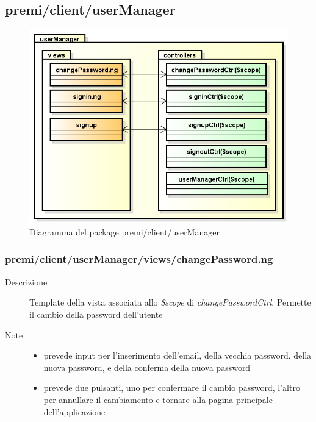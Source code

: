 \clearpage
\subsection{premi/client/userManager}
\begin{figure}[h]
\begin{center}
\includegraphics[scale=0.50]{img/diapkg/userManager.png}
\caption{Diagramma del package premi/client/userManager}
\end{center}
\end{figure}



\subsubsection{premi/client/userManager/views/changePassword.ng}

\begin{description}
\item[Descrizione] \hfill
	Template della vista associata allo \textit{\$scope} di \textit{changePasswordCtrl}. Permette il cambio della password dell'utente
\item[Note] \hfill
	\begin{itemize}
			\item prevede input per l'inserimento dell'email, della vecchia password, della nuova password, e della conferma della nuova password
			\item prevede due pulsanti, uno per confermare il cambio password, l'altro per annullare il cambiamento e tornare alla pagina principale dell'applicazione
	\end{itemize}
\end{description}

